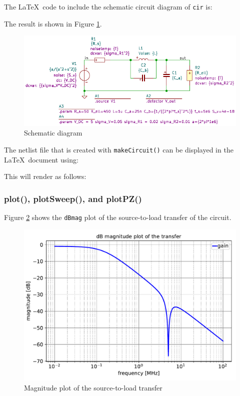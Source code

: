 \documentclass[a4paper,12pt]{article}
\begin{document}


The \LaTeX$\,$ code to include the schematic circuit diagram of {\texttt{cir}} is:



The result is shown in Figure \ref{fig-myPassiveNetwork}.

\begin{figure}[h]
\centering
 \includegraphics[width=16cm]{../img/myPassiveNetwork.pdf}
 \caption{Schematic diagram}
 \label{fig-myPassiveNetwork}
\end{figure}

The netlist file that is created with {\texttt{makeCircuit()}} can be displayed in the \LaTeX$\,$ document using:



This will render as follows:



\subsubsection{plot(), plotSweep(), and plotPZ()}

Figure \ref{fig-dBmag} shows the {\texttt{dBmag}} plot of the source-to-load transfer of the circuit.

\begin{figure}[h]
\centering
 \includegraphics[width=12cm]{../img/dBmag.pdf}
 \caption{Magnitude plot of the source-to-load transfer}
 \label{fig-dBmag}
\end{figure}
\end{document}
